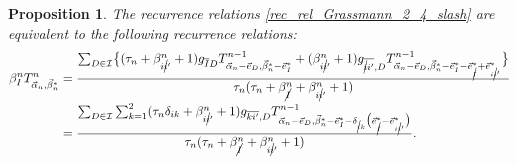\documentclass[pdftex]{sigma}
\numberwithin{equation}{section}
\newtheorem{Proposition}[Theorem]{Proposition}
 { \theoremstyle{definition}
\newtheorem{Definition}[Theorem]{Definition}
\newtheorem{Note}[Theorem]{Note}
\newtheorem{Example}[Theorem]{Example}
\newtheorem{Remark}[Theorem]{Remark} }
\begin{document}
\begin{Proposition}\label{Prop_G24_relation}
The recurrence relations \eqref{rec_rel_Grassmann_2_4_slash} are equivalent to the following recurrence relations:
\begin{align}
 \beta_{I}^{n}
 T^{n}_{\vec{\alpha}_{n},\vec{\beta}_{n}^{\ast}}
 &=
 \frac{
 \sum_{
 D
 \in
 \mathcal{I}
 }
 \bigl\{
 (
 \tau_{n}
 +
 \beta_{i\cancel{i}'}^{n}
 +
 1
 )
 g_{\overline{I}D}
 T^{n-1}_{
 \vec{\alpha}_{n}
 -
 \vec{e}_{D},
 \vec{\beta}_{n}^{\ast}
 -
 \vec{e}_{I}^{\ast}
 }
 +
 (
 \beta_{i\cancel{i}'}^{n}
 +
 1
 )
 g_{\overline{\cancel{i}i'},D}
 T^{n-1}_{
 \vec{\alpha}_{n}
 -
 \vec{e}_{D},
 \vec{\beta}_{n}^{\ast}
 -
 \vec{e}_{I}^{\ast}
 -
 \vec{e}_{\cancel{I}}^{\ast}
 +
 \vec{e}_{i\cancel{i}'}^{\ast}
 }
 \bigr\}
 }{
 \tau_{n}
 (
 \tau_{n}
 +
 \beta_{\cancel{I}}^{n}
 +
 \beta_{i\cancel{i}'}^{n}
 +
 1
 )
 }
 \nonumber
 \\
 &=
 \frac{
 \sum_{
 D
 \in
 \mathcal{I}
 }
 \sum_{k=1}^{2}
 (
 \tau_{n}
 \delta_{ik}
 +
 \beta_{i\cancel{i}'}^{n}
 +
 1
 )
 g_{\overline{ki'},D}
 T^{n-1}_{
 \vec{\alpha}_{n}
 -
 \vec{e}_{D},
 \vec{\beta}_{n}^{\ast}
 -
 \vec{e}_{I}^{\ast}
 -
 \delta_{\cancel{i}k}
 \bigl(
 \vec{e}_{\cancel{I}}^{\ast}
 -
 \vec{e}_{i\cancel{i}'}^{\ast}
 \bigr)
 }
 }{
 \tau_{n}
 (
 \tau_{n}
 +
 \beta_{\cancel{I}}^{n}
 +
 \beta_{i\cancel{i}'}^{n}
 +
 1
 )
 }.
\label{G24_n_relation}
\end{align}
\end{Proposition}
\end{document}
